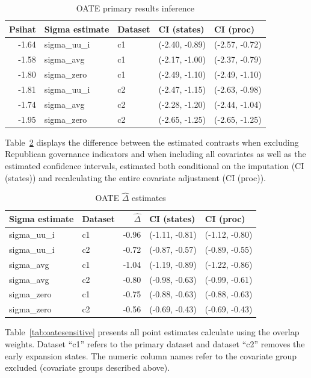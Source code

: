 \documentclass[aoas]{imsart}
\theoremstyle{plain}
\theoremstyle{remark}
\begin{document}
\begin{appendix}
\begin{table}[ht]
\centering
\caption{OATE primary results inference}
\label{tab:oateconfint}
\begin{tabular}{rllll}
  \hline
Psihat & Sigma estimate & Dataset & CI (states) & CI (proc) \\ 
  \hline
-1.64 & sigma\_uu\_i & c1 & (-2.40, -0.89) & (-2.57, -0.72) \\ 
  -1.58 & sigma\_avg & c1 & (-2.17, -1.00) & (-2.37, -0.79) \\ 
  -1.80 & sigma\_zero & c1 & (-2.49, -1.10) & (-2.49, -1.10) \\ 
  -1.81 & sigma\_uu\_i & c2 & (-2.47, -1.15) & (-2.63, -0.98) \\ 
  -1.74 & sigma\_avg & c2 & (-2.28, -1.20) & (-2.44, -1.04) \\ 
  -1.95 & sigma\_zero & c2 & (-2.65, -1.25) & (-2.65, -1.25) \\ 
   \hline
\end{tabular}
\end{table}

Table~\ref{tab:oaterepubdiff} displays the difference between the estimated contrasts when excluding Republican governance indicators and when including all covariates as well as the estimated confidence intervals, estimated both conditional on the imputation (CI (states)) and recalculating the entire covariate adjustment (CI (proc)).

\begin{table}[ht]
\centering
\caption{OATE $\hat{\Delta}$ estimates}
\label{tab:oaterepubdiff}
\begin{tabular}{llrll}
  \hline
Sigma estimate & Dataset & $\hat{\Delta}$ & CI (states) & CI (proc) \\ 
  \hline
sigma\_uu\_i & c1 & -0.96 & (-1.11, -0.81) & (-1.12, -0.80) \\ 
  sigma\_uu\_i & c2 & -0.72 & (-0.87, -0.57) & (-0.89, -0.55) \\ 
  sigma\_avg & c1 & -1.04 & (-1.19, -0.89) & (-1.22, -0.86) \\ 
  sigma\_avg & c2 & -0.80 & (-0.98, -0.63) & (-0.99, -0.61) \\ 
  sigma\_zero & c1 & -0.75 & (-0.88, -0.63) & (-0.88, -0.63) \\ 
  sigma\_zero & c2 & -0.56 & (-0.69, -0.43) & (-0.69, -0.43) \\ 
   \hline
\end{tabular}
\end{table}

Table~\ref{tab:oatesensitive} presents all point estimates calculate using the overlap weights. Dataset ``c1'' refers to the primary dataset and dataset ``c2'' removes the early expansion states. The numeric column names refer to the covariate group excluded (covariate groups described above).


\end{appendix}
\end{document}
